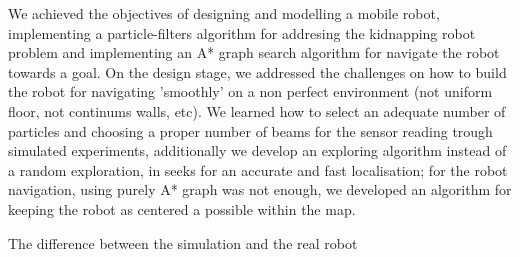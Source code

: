 We achieved the objectives of designing and modelling a mobile robot, implementing a particle-filters algorithm for addresing the kidnapping robot problem and implementing an A* graph search algorithm for navigate the robot towards a goal. On the design stage, we addressed the challenges on how to build the robot for navigating  'smoothly' on a non perfect environment (not uniform floor, not continums walls, etc). We learned how to select an adequate number of particles and choosing a proper number of beams for the sensor reading trough simulated experiments, additionally we develop an exploring algorithm instead of a random exploration, in seeks for an accurate and fast localisation; for the robot navigation, using purely A* graph was not enough, we developed an algorithm for keeping the robot as centered a possible within the map.

The difference between the simulation and the real robot 